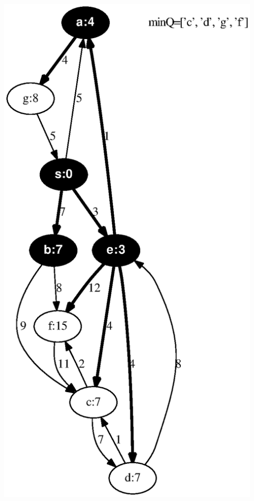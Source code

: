 \documentclass{article}
\begin{document}
\includegraphics[height=.3\textheight]{dijkstra_gross_yellen_04.eps}
\vspace{1em}
\end{document}
